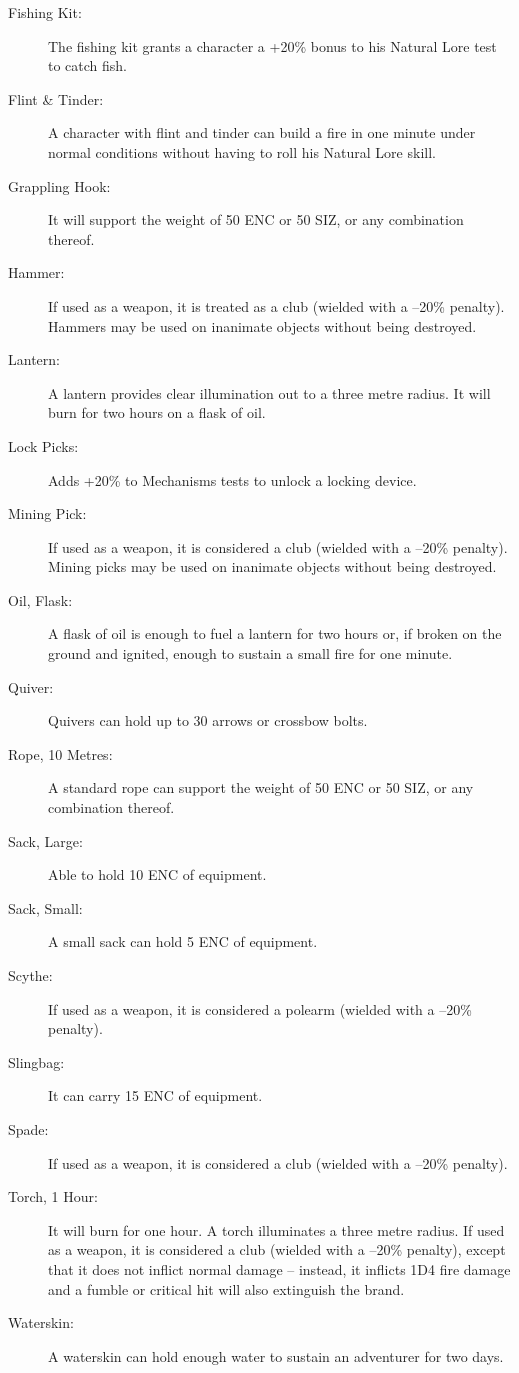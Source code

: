 \begin{description}
	\item[Fishing Kit:] The fishing kit grants a character a +20\% bonus to his Natural Lore test to catch fish. 
	\item[Flint \& Tinder:] A character with flint and tinder can build a fire in one minute under normal conditions without having to roll his Natural Lore skill. 
	\item[Grappling Hook:] It will support the weight of 50 ENC or 50 SIZ, or any combination thereof. 
	\item[Hammer:] If used as a weapon, it is treated as a club (wielded with a –20\% penalty). Hammers may be used on inanimate objects without being destroyed. 
	\item[Lantern:] A lantern provides clear illumination out to a three metre radius. It will burn for two hours on a flask of oil. 
	\item[Lock Picks:] Adds +20\% to Mechanisms tests to unlock a locking device. 
	\item[Mining Pick:] If used as a weapon, it is considered a club (wielded with a –20\% penalty). Mining picks may be used on inanimate objects without being destroyed. 
	\item[Oil, Flask:] A flask of oil is enough to fuel a lantern for two hours or, if broken on the ground and ignited, enough to sustain a small fire for one minute. 
	\item[Quiver:] Quivers can hold up to 30 arrows or crossbow bolts. 
	\item[Rope, 10 Metres:] A standard rope can support the weight of 50 ENC or 50 SIZ, or any combination thereof. 
	\item[Sack, Large:] Able to hold 10 ENC of equipment. 
	\item[Sack, Small:] A small sack can hold 5 ENC of equipment. 
	\item[Scythe:] If used as a weapon, it is considered a polearm (wielded with a –20\% penalty). 
	\item[Slingbag:] It can carry 15 ENC of equipment. 
	\item[Spade:] If used as a weapon, it is considered a club (wielded with a –20\% penalty). 
	\item[Torch, 1 Hour:] It will burn for one hour. A torch illuminates a three metre radius. If used as a weapon, it is considered a club (wielded with a –20\% penalty), except that it does not inflict normal damage – instead, it inflicts 1D4 fire damage and a fumble or critical hit will also extinguish the brand. 
	\item[Waterskin:] A waterskin can hold enough water to sustain an adventurer for two days.
\end{description}

